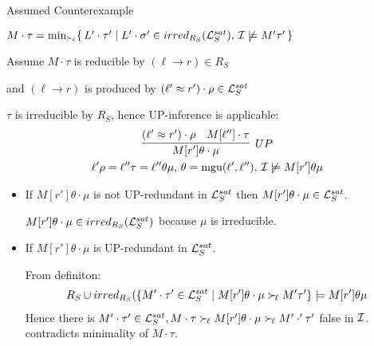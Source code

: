 \documentclass[%
handout,
]{beamer}
\begin{document}
\begin{frame}[allowframebreaks]{Assumed Counterexample}




    \textcolor{gray}{$
    M\cdot\tau = \min_{\mathrel\succ_{\!\ell}}\!
    \left\{\,
        L'\cdot\tau' \mid
        L'\cdot\sigma' \in irred_{R_S}(\mathcal{L}_S^{sat}),\,
        \mathcal{I} \not\models M'\tau'\,
    \right\}
    $}

        Assume $M\cdot\tau$ is reducible by $(\ell\to r)\in R_S$

        and $(\ell\to r)$ is produced by $(\ell'\approx r')\cdot\rho\in\mathcal{L}_S^{sat}$

        $\tau$ is irreducible by $R_S$,
        hence UP-inference is applicable:
        \begin{gather*}
            \infer[UP]
            {M[r']\theta\cdot\mu}
            {(\ell'\mEQ r')\cdot\rho & M[\ell'']\cdot\tau}
            \\
            \ell'\rho = \ell''\tau = \ell''\theta\mu,\,
            \theta=\mgu(\ell',\ell''),\,
            \mcI\not\models M[r']\theta\mu
        \end{gather*}
        \pagebreak

        \begin{itemize}
            \item If $M[r']\theta\cdot\mu$ is not UP-redundant in $\mathcal{L}_S^{sat}$
            then $M[r']\theta\cdot\mu\in\mathcal{L}_S^{sat}$.

            $M[r']\theta\cdot\mu\in irred_{R_S}(\mathcal{L}_S^{sat})$ because $\mu$ is irreducible.


            \item If $M[r']\theta\cdot\mu$ is UP-redundant in $\mathcal{L}_S^{sat}$.

             From definiton:
            \begin{gather*}
                R_S \cup irred_{R_S}(
                \{
                    M'\cdot\tau'\in\mathcal{L}_S^{sat}\mid
                    M[r']\theta\cdot\mu \mathrel\succ_{\!\ell} M'\tau'
                    \} \models M[r']\theta\mu
            \end{gather*}
            Hence there is $M'\cdot\tau'\in\mathcal{L}_S^{sat},
            M\cdot\tau\mathrel\succ_{\!\ell} M[r']\theta\cdot\mu\mathrel\succ_{\!\ell} M'\cdot'\tau'$
            false in $\mathcal{I}$.
            contradicts minimality of $M\cdot\tau$.


\end{itemize}
\end{frame}
\end{document}
